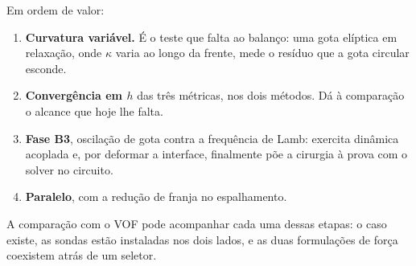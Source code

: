 Em ordem de valor:

\begin{enumerate}
  \item \textbf{Curvatura vari\'avel.} \'E o teste que falta ao balan\c{c}o:
    uma gota el\'iptica em relaxa\c{c}\~ao, onde $\kappa$ varia ao longo da
    frente, mede o res\'iduo que a gota circular esconde.
  \item \textbf{Converg\^encia em $h$} das tr\^es m\'etricas, nos dois m\'etodos.
    D\'a \`a compara\c{c}\~ao o alcance que hoje lhe falta.
  \item \textbf{Fase B3}, oscila\c{c}\~ao de gota contra a frequ\^encia de Lamb:
    exercita din\^amica acoplada e, por deformar a interface, finalmente p\~oe a
    cirurgia \`a prova com o solver no circuito.
  \item \textbf{Paralelo}, com a redu\c{c}\~ao de franja no espalhamento.
\end{enumerate}

A compara\c{c}\~ao com o VOF pode acompanhar cada uma dessas etapas: o caso
existe, as sondas est\~ao instaladas nos dois lados, e as duas formula\c{c}\~oes
de for\c{c}a coexistem atr\'as de um seletor.
